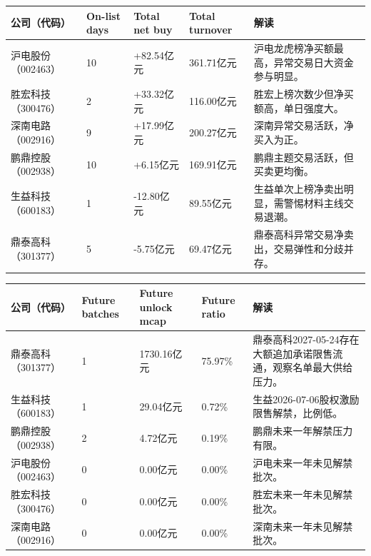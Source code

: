 \begin{exhibitbox}
\footnotesize
\begin{tabularx}{\textwidth}{L{1.8cm}R{1.2cm}R{1.8cm}R{1.8cm}X}
\toprule
\textbf{公司（代码）} & \textbf{On-list days} & \textbf{Total net buy} & \textbf{Total turnover} & \textbf{解读} \\
\midrule
沪电股份（002463） & 10 & +82.54亿元 & 361.71亿元 & 沪电龙虎榜净买额最高，异常交易日大资金参与明显。 \\
胜宏科技（300476） & 2 & +33.32亿元 & 116.00亿元 & 胜宏上榜次数少但净买额高，单日强度大。 \\
深南电路（002916） & 9 & +17.99亿元 & 200.27亿元 & 深南异常交易活跃，净买入为正。 \\
鹏鼎控股（002938） & 10 & +6.15亿元 & 169.91亿元 & 鹏鼎主题交易活跃，但买卖更均衡。 \\
生益科技（600183） & 1 & -12.80亿元 & 89.55亿元 & 生益单次上榜净卖出明显，需警惕材料主线交易退潮。 \\
鼎泰高科（301377） & 5 & -5.75亿元 & 69.47亿元 & 鼎泰高科异常交易净卖出，交易弹性和分歧并存。 \\
\bottomrule
\end{tabularx}
\end{exhibitbox}

\begin{exhibitbox}
\footnotesize
\begin{tabularx}{\textwidth}{L{1.8cm}R{1.5cm}R{2.0cm}R{1.6cm}X}
\toprule
\textbf{公司（代码）} & \textbf{Future batches} & \textbf{Future unlock mcap} & \textbf{Future ratio} & \textbf{解读} \\
\midrule
鼎泰高科（301377） & 1 & 1730.16亿元 & 75.97\% & 鼎泰高科2027-05-24存在大额追加承诺限售流通，观察名单最大供给压力。 \\
生益科技（600183） & 1 & 29.04亿元 & 0.72\% & 生益2026-07-06股权激励限售解禁，比例低。 \\
鹏鼎控股（002938） & 2 & 4.72亿元 & 0.19\% & 鹏鼎未来一年解禁压力有限。 \\
沪电股份（002463） & 0 & 0.00亿元 & 0.00\% & 沪电未来一年未见解禁批次。 \\
胜宏科技（300476） & 0 & 0.00亿元 & 0.00\% & 胜宏未来一年未见解禁批次。 \\
深南电路（002916） & 0 & 0.00亿元 & 0.00\% & 深南未来一年未见解禁批次。 \\
\bottomrule
\end{tabularx}
\end{exhibitbox}

